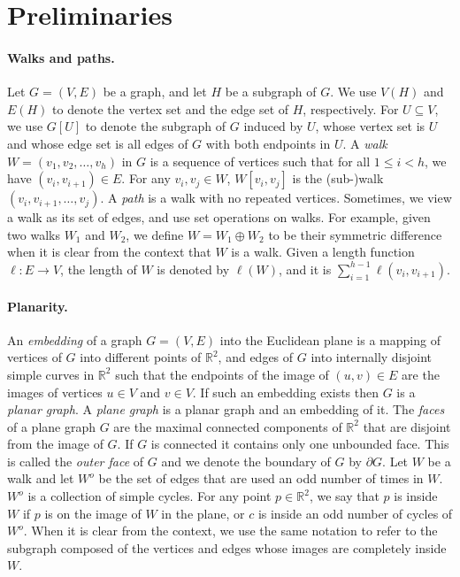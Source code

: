 \documentclass[11pt,twoside]{article}
\newcommand{\EMPH}[1]{\emph{#1}}
\newcommand{\len}[1]{\ell(#1)}
\begin{document}
\section{Preliminaries}

\paragraph{Walks and paths.} Let $G = (V, E)$ be a graph, and let $H$ be a subgraph of $G$.  We use $V(H)$ and $E(H)$ to denote the vertex set and the edge set of $H$, respectively.  For $U \subseteq V$, we use \EMPH{$G[U]$} to denote the subgraph of $G$ induced by $U$, whose vertex set is $U$ and whose edge set is all edges of $G$ with both endpoints in $U$.  A \EMPH{walk} $W = (v_{1}, v_{2}, \ldots, v_{h})$ in $G$ is a sequence of vertices such that for all $1\leq i < h$, we have $(v_i, v_{i+1}) \in E$.  For any $v_i, v_j \in W$, \EMPH{$W[v_i, v_j]$} is the (sub-)walk $(v_i, v_{i+1}, \ldots, v_j)$.
A \EMPH{path} is a walk with no repeated vertices.  Sometimes, we view a walk as its set of edges, and use set operations on walks.  For example, given two walks $W_1$ and $W_2$, we define $W = W_1\oplus W_2$ to be their symmetric difference when it is clear from the context that $W$ is a walk.  Given a length function $\ell:E\rightarrow V$, the length of $W$ is denoted by \EMPH{$\len{W}$}, and it is $\sum_{i=1}^{h-1}{\ell(v_i, v_{i+1})}$.

\paragraph{Planarity.}
An \EMPH{embedding} of a graph $G = (V,E)$ into the Euclidean plane is a mapping of vertices of $G$ into different points of $\mathbb{R}^2$, and edges of $G$ into internally disjoint simple curves in $\mathbb{R}^2$ such that the endpoints of the image of $(u,v) \in E$ are the images of vertices $u \in V$ and $v \in V$.  If such an embedding exists then $G$ is a \EMPH{planar graph}.  A \EMPH{plane graph} is a planar graph and an embedding of it.  The \EMPH{faces} of a plane graph $G$ are the maximal connected components of $\mathbb{R}^2$ that are disjoint from the image of $G$.  If $G$ is connected it contains only one unbounded face.  This is called the \EMPH{outer face} of $G$ and we denote the boundary of $G$ by $\partial G$.
Let $W$ be a walk and let $W^o$ be the set of edges that are used an odd number of times in $W$.  
$W^o$ is a collection of simple cycles.  For any point $p\in \mathbb{R}^2$, we say that $p$ is inside $W$ if $p$ is on the image of $W$ in the plane, or $c$ is inside an odd number of cycles of $W^o$.
When it is clear from the context, we use the same notation to refer to the subgraph composed of the vertices and edges whose images are completely inside $W$. 
\end{document}
